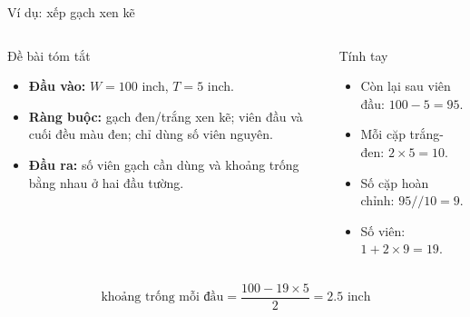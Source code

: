 \documentclass[aspectratio=169,10pt]{beamer}
\begin{document}


\begin{frame}{Ví dụ: xếp gạch xen kẽ}
\small
\begin{columns}[T,totalwidth=0.94\textwidth]
\begin{block}{Đề bài tóm tắt}
\begin{itemize}
  \item \textbf{Đầu vào:} $W=100$ inch, $T=5$ inch.
  \item \textbf{Ràng buộc:} gạch đen/trắng xen kẽ; viên đầu và cuối đều màu đen; chỉ dùng số viên nguyên.
  \item \textbf{Đầu ra:} số viên gạch cần dùng và khoảng trống bằng nhau ở hai đầu tường.
\end{itemize}
\end{block}
\hfill
{}
\begin{block}{Tính tay}
\begin{itemize}
  \item Còn lại sau viên đầu: $100-5=95$.
  \item Mỗi cặp trắng-đen: $2\times 5=10$.
  \item Số cặp hoàn chỉnh: $95//10=9$.
  \item Số viên: $1+2\times 9=19$.
\end{itemize}
\end{block}
\end{columns}
\vspace{0.25cm}
\[
\text{khoảng trống mỗi đầu} = \frac{100 - 19\times 5}{2} = 2.5\text{ inch}
\]
\end{frame}

\end{document}
